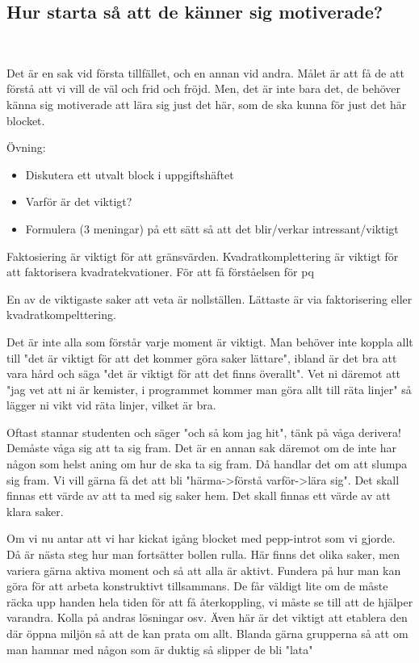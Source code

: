 \subsection{Hur starta så att de känner sig motiverade?}\hfill\\
\par\bigskip
\noindent Det är en sak vid första tillfället, och en annan vid andra. Målet är att få de att förstå att vi vill de väl och frid och fröjd. Men, det är inte bara det, de behöver känna sig motiverade att lära sig just det här, som de ska kunna för just det här blocket.\par
\noindent Övning:
\par\bigskip
\begin{itemize}
  \item Diskutera ett utvalt block i uppgiftshäftet
  \item Varför är det viktigt?
  \item Formulera (3 meningar) på ett sätt så att det blir/verkar intressant/viktigt 
\end{itemize}
\par\bigskip
\noindent Faktosiering är viktigt för att gränsvärden. Kvadratkomplettering är viktigt för att faktorisera kvadratekvationer. För att få förståelsen för pq \par
\noindent En av de viktigaste saker att veta är nollställen. Lättaste är via faktorisering eller kvadratkompelttering.
\par\bigskip
\noindent Det är inte alla som förstår varje moment är viktigt. Man behöver inte koppla allt till "det  är viktigt för att det kommer göra saker lättare", ibland är det bra att vara hård och säga "det är viktigt för att det finns överallt". Vet ni däremot att "jag vet att ni är kemister, i programmet kommer man göra allt till räta linjer" så lägger ni vikt vid räta linjer, vilket är bra. 
\par\bigskip
\noindent Oftast stannar studenten och säger "och så kom jag hit", tänk på våga derivera! Demåste våga sig att ta sig fram. Det är en annan sak däremot om de inte har någon som helst aning om hur de ska ta sig fram. Då handlar det om att slumpa sig fram. Vi vill gärna få det att bli "härma->förstå varför->lära sig". Det skall finnas ett värde av att ta med sig saker hem. Det skall finnas ett värde av att klara saker. 
\par\bigskip
\noindent Om vi nu antar att vi har kickat igång blocket med pepp-introt som vi gjorde. Då är nästa steg hur man fortsätter bollen rulla. Här finns det olika saker, men variera gärna aktiva moment och så att alla är aktivt. Fundera på hur man kan göra för att arbeta konstruktivt tillsammans. De får väldigt lite om de måste räcka upp handen hela tiden för att få återkoppling, vi måste se till att de hjälper varandra. Kolla på andras lösningar osv. Även här är det viktigt att etablera den där öppna miljön så att de kan prata om allt. Blanda gärna grupperna så att om man hamnar med någon som är duktig så slipper de bli "lata"
